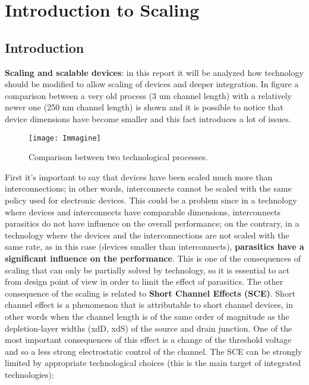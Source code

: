 \documentclass[a4paper, 12pt, twoside, openright]{report}
\begin{document}
\tableofcontents


\chapter{Introduction to Scaling}


\section{Introduction}

\textbf{Scaling and scalable devices}: in this report it will be analyzed how technology should be modified to allow scaling of devices and deeper integration.
In figure \label{confronto} a comparison between a very old process (3 um channel length) with a relatively newer one (250 nm channel length) is shown and it is possible to notice that device dimensions have become smaller and this fact introduces a lot of issues.

	\begin{figure}[h]
	\centering
	\texttt{[image: Immagine]}
	\caption{Comparison between two technological processes.}
	\label{confronto}
	\end{figure}

First it's important to say that devices have been scaled much more than interconnections; in other words, interconnects cannot be scaled with the same policy used for electronic devices. This could be a problem since in a technology where devices and interconnects have comparable dimensions, interconnects parasitics do not have influence on the overall performance; on the contrary, in a technology where the devices and the interconnections are not scaled with the same rate, as in this case (devices smaller than interconnects), \textbf{parasitics have a significant influence on the performance}. This is one of the consequences of scaling that can only be partially solved by technology, so it is essential to act from design point of view in order to limit the effect of parasitics. The other consequence of the scaling is related to \textbf{Short Channel Effects (SCE)}. Short channel effect is a phenomenon that is attributable to short channel devices, in other words when the channel length is of the same order of magnitude as the depletion-layer widths (xdD, xdS) of the source and drain junction. One of the most important consequences of this effect is a change of the threshold voltage and so a less strong electrostatic control of the channel. The SCE can be strongly limited by appropriate technological choices (this is the main target of integrated technologies); \\
\end{document}
